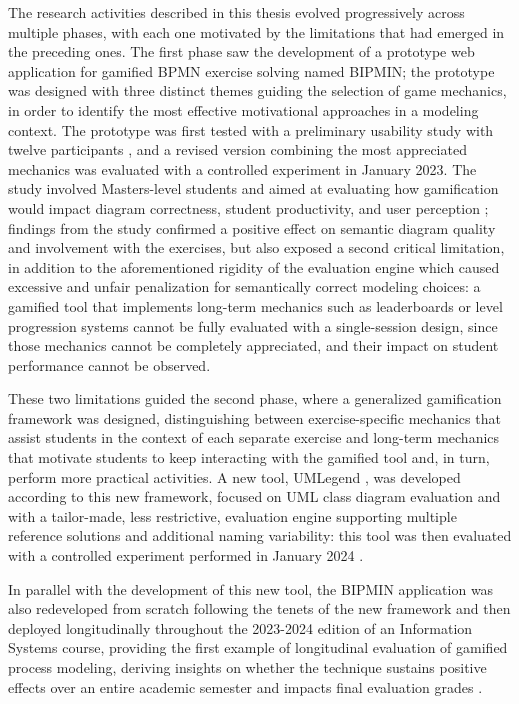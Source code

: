 The research activities described in this thesis evolved progressively across multiple phases, with each one motivated by the limitations that had emerged in the preceding ones. The first phase saw the development of a prototype web application for gamified BPMN exercise solving named BIPMIN; the prototype was designed with three distinct themes guiding the selection of game mechanics, in order to identify the most effective motivational approaches in a modeling context. The prototype was first tested with a preliminary usability study with twelve participants \cite{bedwell_bipmin_2023}, and a revised version combining the most appreciated mechanics was evaluated with a controlled experiment in January 2023. The study involved Masters-level students and aimed at evaluating how gamification would impact diagram correctness, student productivity, and user perception \cite{garaccione_gamification_2023, garaccione_gamification_2024}; findings from the study confirmed a positive effect on semantic diagram quality and involvement with the exercises, but also exposed a second critical limitation, in addition to the aforementioned rigidity of the evaluation engine which caused excessive and unfair penalization for semantically correct modeling choices: a gamified tool that implements long-term mechanics such as leaderboards or level progression systems cannot be fully evaluated with a single-session design, since those mechanics cannot be completely appreciated, and their impact on student performance cannot be observed.

These two limitations guided the second phase, where a generalized gamification framework was designed, distinguishing between exercise-specific mechanics that assist students in the context of each separate exercise and long-term mechanics that motivate students to keep interacting with the gamified tool and, in turn, perform more practical activities. A new tool, UMLegend \cite{cagnazzo_2023_umlegend}, was developed according to this new framework, focused on UML class diagram evaluation and with a tailor-made, less restrictive, evaluation engine supporting multiple reference solutions and additional naming variability: this tool was then evaluated with a controlled experiment performed in January 2024 \cite{garaccione_2024_sqj, garaccione_2026_gamification}.

In parallel with the development of this new tool, the BIPMIN application was also redeveloped from scratch following the tenets of the new framework and then deployed longitudinally throughout the 2023-2024 edition of an Information Systems course, providing the first example of longitudinal evaluation of gamified process modeling, deriving insights on whether the technique sustains positive effects over an entire academic semester and impacts final evaluation grades \cite{garaccione2024ease, garaccione2024esem}.


